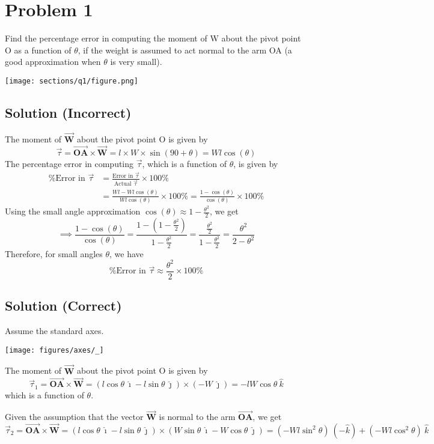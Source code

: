 \section*{Problem 1}

Find the percentage error in computing the moment of W about the pivot point O as a function of \( \theta \), if the weight is assumed to act normal to the arm OA (a good approximation when \( \theta \) is very small).

\begin{figure*}[h]
    \centering
    \texttt{[image: sections/q1/figure.png]}
\end{figure*}

\subsection*{Solution (Incorrect)}

The moment of \( \vec{\mathbf{W}} \) about the pivot point O is given by
\[
    \vec{\tau} = \vec{\mathbf{OA}} \times \vec{\mathbf{W}}
    = l \times W \times \sin(90 + \theta)
    = W l \cos(\theta)
\]
The percentage error in computing \( \vec{\tau} \), which is a function of \( \theta \),  is given by
\begin{align*}
    \text{\%Error in } \vec{\tau}
     & =
    \frac{\text{Error in }\vec{\tau}}{\text{Actual }\vec{\tau}} \times 100\% \\
     & = \frac{W l - W l \cos(\theta)}{W l \cos(\theta)} \times 100\%
    = \frac{1 - \cos(\theta)}{\cos(\theta)} \times 100\%
\end{align*}
Using the small angle approximation \( \cos(\theta) \approx 1 - \frac{\theta^2}{2} \), we get
\[
    \implies \frac{1 - \cos(\theta)}{\cos(\theta)}
    = \frac{1 - (1 - \frac{\theta^2}{2})}{1 - \frac{\theta^2}{2}}
    = \frac{\frac{\theta^2}{2}}{1 - \frac{\theta^2}{2}}
    = \frac{\theta^2}{2 - \theta^2}
\]
Therefore, for small angles \( \theta \), we have
\[
    \boxed{
        \text{\%Error in } \vec{\tau} \approx \frac{\theta^2}{2} \times 100\%
    }
\]

\subsection*{Solution (Correct)}

Assume the standard axes.
\begin{figure*}[h]
    \centering
    \texttt{[image: figures/axes/\_]}
\end{figure*}

The moment of \( \vec{\mathbf{W}} \) about the pivot point O is given by
\[
    \vec{\tau}_1 = \vec{\mathbf{OA}} \times \vec{\mathbf{W}}
    = (l \cos \theta \ \hat{\imath} - l \sin \theta \ \hat{\jmath}) \times (- W \ \hat{\jmath})
    = -lW \cos \theta \ \hat{k}
\]
which is a function of \( \theta \).

Given the assumption that the vector \( \vec{\mathbf{W}} \) is normal to the arm \( \vec{\mathbf{OA}} \), we get
\[
    \vec{\tau}_2 = \vec{\mathbf{OA}} \times \vec{\mathbf{W}}
    = (l \cos \theta \ \hat{\imath} - l \sin \theta \ \hat{\jmath}) \times (W \sin \theta \ \hat{\imath} - W \cos \theta \ \hat{\jmath})
    = (- Wl \sin^2 \theta) \ (- \hat{k}) + (-Wl \cos^2 \theta) \ \hat{k}
\]
